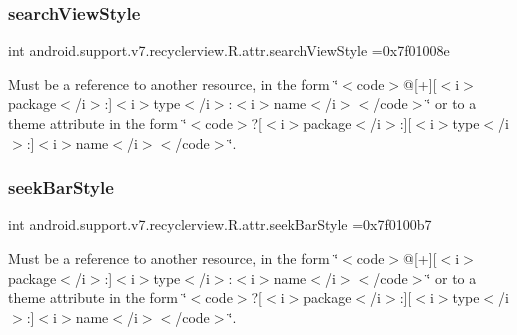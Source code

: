 \subsubsection{\texorpdfstring{search\+View\+Style}{searchViewStyle}}
{\footnotesize\ttfamily int android.\+support.\+v7.\+recyclerview.\+R.\+attr.\+search\+View\+Style =0x7f01008e\hspace{0.3cm}{\ttfamily [static]}}

Must be a reference to another resource, in the form \char`\"{}$<$code$>$@\mbox{[}+\mbox{]}\mbox{[}$<$i$>$package$<$/i$>$\+:\mbox{]}$<$i$>$type$<$/i$>$\+:$<$i$>$name$<$/i$>$$<$/code$>$\char`\"{} or to a theme attribute in the form \char`\"{}$<$code$>$?\mbox{[}$<$i$>$package$<$/i$>$\+:\mbox{]}\mbox{[}$<$i$>$type$<$/i$>$\+:\mbox{]}$<$i$>$name$<$/i$>$$<$/code$>$\char`\"{}. \mbox{\label{classandroid_1_1support_1_1v7_1_1recyclerview_1_1R_1_1attr_a68174966c0b9b6567b9a55fe38ef7e3e}} 
\subsubsection{\texorpdfstring{seek\+Bar\+Style}{seekBarStyle}}
{\footnotesize\ttfamily int android.\+support.\+v7.\+recyclerview.\+R.\+attr.\+seek\+Bar\+Style =0x7f0100b7\hspace{0.3cm}{\ttfamily [static]}}

Must be a reference to another resource, in the form \char`\"{}$<$code$>$@\mbox{[}+\mbox{]}\mbox{[}$<$i$>$package$<$/i$>$\+:\mbox{]}$<$i$>$type$<$/i$>$\+:$<$i$>$name$<$/i$>$$<$/code$>$\char`\"{} or to a theme attribute in the form \char`\"{}$<$code$>$?\mbox{[}$<$i$>$package$<$/i$>$\+:\mbox{]}\mbox{[}$<$i$>$type$<$/i$>$\+:\mbox{]}$<$i$>$name$<$/i$>$$<$/code$>$\char`\"{}. \mbox{\label{classandroid_1_1support_1_1v7_1_1recyclerview_1_1R_1_1attr_a354f075fc14b64fcdc73d3d6e6ad78e0}} 
